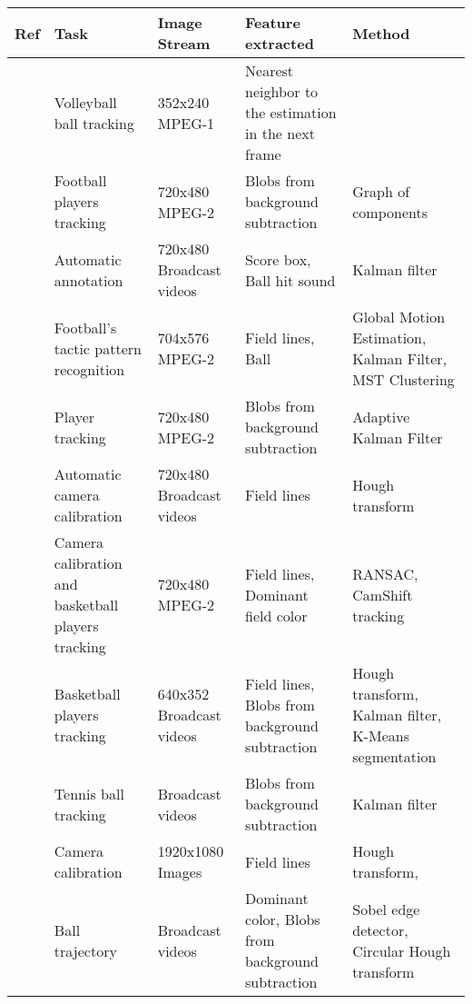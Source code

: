 \begin{table}[ht]
	\centering
	\begin{adjustbox}{width=1\textwidth, angle=0}
	\small
	\begin{tabular}{  l l l l l  }
		\hline
		\textbf{Ref} & \textbf{Task} & \textbf{Image Stream} & \textbf{Feature extracted} & \textbf{Method} \\ \hline
		\cite{Chen:2007jma} & Volleyball ball tracking & 352x240 MPEG-1 & Nearest neighbor to the estimation in the next frame \\
		
		\cite{Figueroa:2006dq} & Football players tracking & 720x480 MPEG-2  & Blobs from background subtraction &  Graph of components  \\
		
		\cite{Lai:2011gf} & Automatic annotation  & 720x480 Broadcast videos   & Score box, Ball hit sound  & Kalman filter \\
		
		\cite{Niu:2012dz} & Football's tactic pattern recognition  &  704x576 MPEG-2  & Field lines, Ball  & Global Motion Estimation, Kalman Filter, MST Clustering \\
		
		\cite{Fang:2014uz} & Player tracking & 720x480 MPEG-2   & Blobs from background subtraction & Adaptive Kalman Filter \\
		
		\cite{Farin:2004ix} & Automatic camera calibration & 720x480 Broadcast videos  & Field lines & Hough transform \\
		
		\cite{Hu:2011fu} & Camera calibration and basketball players tracking &  720x480 MPEG-2  & Field lines, Dominant field color  & RANSAC,  CamShift tracking \\
		
		\cite{Chen:2012cc} &  Basketball players tracking & 640x352 Broadcast videos & Field lines, Blobs from background subtraction  & Hough transform, Kalman filter, K-Means segmentation \\
		
		\cite{Yan:2015ca} & Tennis ball tracking & Broadcast videos & Blobs from background subtraction  & Kalman filter  \\
		
		\cite{AlemanFlores:2014ey} & Camera calibration & 1920x1080 Images & Field lines & Hough transform,  \\
		
		\cite{Pallavi:2008em} & Ball trajectory & Broadcast videos  & Dominant color, Blobs from background subtraction & Sobel edge detector, Circular Hough transform \\
		

\end{tabular}
\end{adjustbox}
\end{table}

